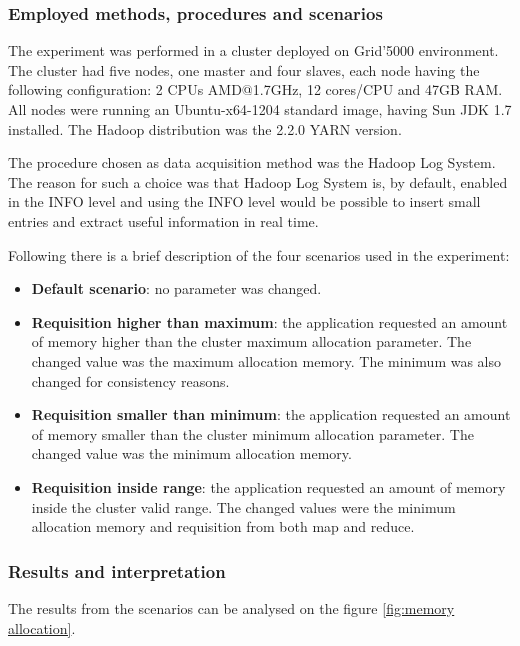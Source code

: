 \subsubsection{Employed methods, procedures and scenarios}
The experiment was performed in a cluster deployed on Grid'5000 environment. The cluster had five nodes, one master and four slaves, each node having the following configuration: 2 CPUs AMD@1.7GHz, 12 cores/CPU and 47GB RAM. All nodes were running an Ubuntu-x64-1204 standard image, having Sun JDK 1.7 installed. The Hadoop distribution was the 2.2.0 YARN version.

The procedure chosen as data acquisition method was the Hadoop Log System. The reason for such a choice was that Hadoop Log System is, by default, enabled in the INFO level and using the INFO level would be possible to insert small entries and extract useful information in real time.

Following there is a brief description of the four scenarios used in the experiment:

\begin{itemize}
	\item \textbf{Default scenario}: no parameter was changed.
	\item \textbf{Requisition higher than maximum}: the application requested an amount of memory higher than the cluster maximum allocation parameter. The changed value was the maximum allocation memory. The minimum was also changed for consistency reasons.
	\item \textbf{Requisition smaller than minimum}: the application requested an amount of memory smaller than the cluster minimum allocation parameter. The changed value was the minimum allocation memory.
	\item \textbf{Requisition inside range}: the application requested an amount of memory inside the cluster valid range. The changed values were the minimum allocation memory and requisition from both map and reduce.
\end{itemize}

\subsubsection{Results and interpretation}

The results from the scenarios can be analysed on the figure \ref{fig:memory allocation}.

